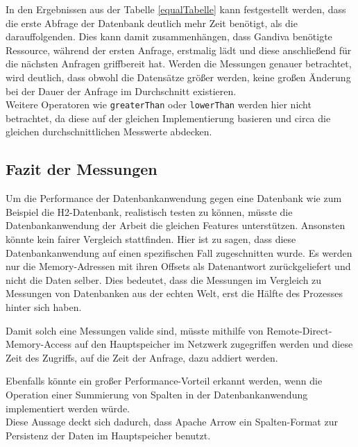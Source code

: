 In den Ergebnissen aus der Tabelle \ref{equalTabelle} kann festgestellt werden, dass die erste Abfrage der Datenbank deutlich mehr Zeit benötigt, als die darauffolgenden. Dies kann damit zusammenhängen, dass Gandiva benötigte Ressource, während der ersten Anfrage, erstmalig lädt und diese anschließend für die nächsten Anfragen griffbereit hat.
Werden die Messungen genauer betrachtet, wird deutlich, dass obwohl die Datensätze größer werden, keine großen Änderung bei der Dauer der Anfrage im Durchschnitt existieren.\\
Weitere Operatoren wie \texttt{greaterThan} oder \texttt{lowerThan} werden hier nicht betrachtet, da diese auf der gleichen Implementierung basieren und circa die gleichen durchschnittlichen Messwerte abdecken.

\subsection{Fazit der Messungen}

Um die Performance der Datenbankanwendung gegen eine Datenbank wie zum Beispiel die H2-Datenbank, realistisch testen zu können, müsste die Datenbankanwendung der Arbeit die gleichen Features unterstützen. Ansonsten könnte kein fairer Vergleich stattfinden. Hier ist zu sagen, dass diese Datenbankanwendung auf einen spezifischen Fall zugeschnitten wurde. Es werden nur die Memory-Adressen mit ihren Offsets als Datenantwort zurückgeliefert und nicht die Daten selber. 
Dies bedeutet, dass die Messungen im Vergleich zu Messungen von Datenbanken aus der echten Welt, erst die Hälfte des Prozesses hinter sich haben. 

Damit solch eine Messungen valide sind, müsste mithilfe von Remote-Direct-Memory-Access auf den Hauptspeicher im Netzwerk zugegriffen werden und diese Zeit des Zugriffs, auf die Zeit der Anfrage, dazu addiert werden.

Ebenfalls könnte ein großer Performance-Vorteil erkannt werden, wenn die Operation einer Summierung von Spalten in der Datenbankanwendung implementiert werden würde.\\
Diese Aussage deckt sich dadurch, dass Apache Arrow ein Spalten-Format zur Persistenz der Daten im Hauptspeicher benutzt.



